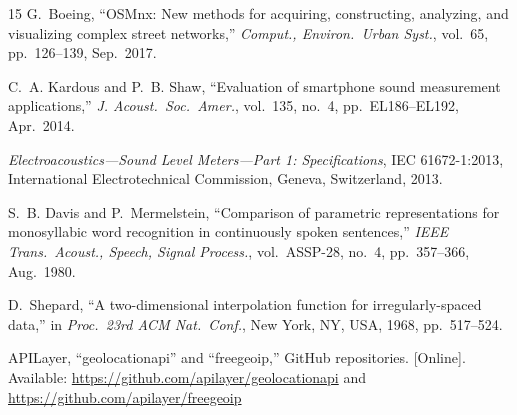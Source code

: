 \documentclass[conference]{IEEEtran}
\begin{document}
\begin{thebibliography}{15}
G.~Boeing, ``OSMnx: New methods for acquiring, constructing, analyzing, and visualizing complex street networks,'' \emph{Comput., Environ.\ Urban Syst.}, vol.~65, pp.~126--139, Sep.\ 2017.

C.~A. Kardous and P.~B. Shaw, ``Evaluation of smartphone sound measurement applications,'' \emph{J. Acoust.\ Soc.\ Amer.}, vol.~135, no.~4, pp.~EL186--EL192, Apr.\ 2014.

\emph{Electroacoustics---Sound Level Meters---Part 1: Specifications}, IEC 61672-1:2013, International Electrotechnical Commission, Geneva, Switzerland, 2013.

S.~B. Davis and P.~Mermelstein, ``Comparison of parametric representations for monosyllabic word recognition in continuously spoken sentences,'' \emph{IEEE Trans.\ Acoust., Speech, Signal Process.}, vol.~ASSP-28, no.~4, pp.~357--366, Aug.\ 1980.

D.~Shepard, ``A two-dimensional interpolation function for irregularly-spaced data,'' in \emph{Proc.\ 23rd ACM Nat.\ Conf.}, New York, NY, USA, 1968, pp.~517--524.

APILayer, ``geolocationapi'' and ``freegeoip,'' GitHub repositories. [Online]. Available: \url{https://github.com/apilayer/geolocationapi} and \url{https://github.com/apilayer/freegeoip}

\end{thebibliography}
\end{document}
